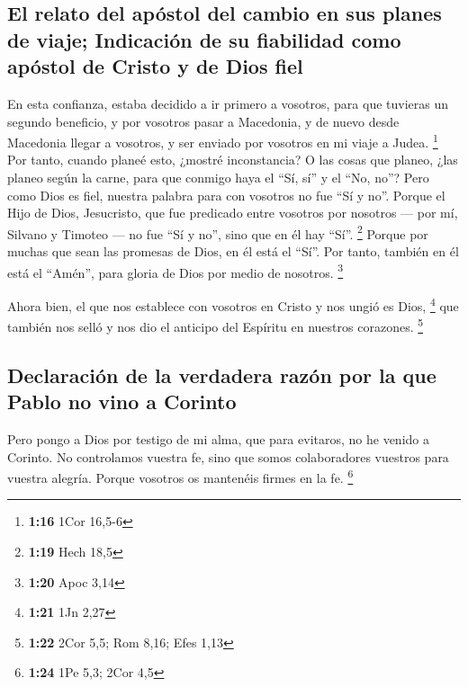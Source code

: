 \begin{paracol}{2}
{\subsection{El relato del apóstol del cambio en sus planes de viaje;
Indicación de su fiabilidad como apóstol de Cristo y de Dios
fiel}\label{el-relato-del-apuxf3stol-del-cambio-en-sus-planes-de-viaje-indicaciuxf3n-de-su-fiabilidad-como-apuxf3stol-de-cristo-y-de-dios-fiel}}

 En esta confianza, estaba decidido a ir primero a
vosotros, para que tuvieras un segundo beneficio,  y por
vosotros pasar a Macedonia, y de nuevo desde Macedonia llegar a
vosotros, y ser enviado por vosotros en mi viaje a Judea. \footnote{\textbf{1:16}
  1Cor 16,5-6}  Por tanto, cuando planeé esto, ¿mostré
inconstancia? O las cosas que planeo, ¿las planeo según la carne, para
que conmigo haya el ``Sí, sí'' y el ``No, no''?  Pero
como Dios es fiel, nuestra palabra para con vosotros no fue ``Sí y no''.
 Porque el Hijo de Dios, Jesucristo, que fue predicado
entre vosotros por nosotros --- por mí, Silvano y Timoteo --- no fue
``Sí y no'', sino que en él hay ``Sí''. \footnote{\textbf{1:19} Hech
  18,5}  Porque por muchas que sean las promesas de Dios,
en él está el ``Sí''. Por tanto, también en él está el ``Amén'', para
gloria de Dios por medio de nosotros. \footnote{\textbf{1:20} Apoc 3,14}

 Ahora bien, el que nos establece con vosotros en Cristo
y nos ungió es Dios, \footnote{\textbf{1:21} 1Jn 2,27} 
que también nos selló y nos dio el anticipo del Espíritu en nuestros
corazones. \footnote{\textbf{1:22} 2Cor 5,5; Rom 8,16; Efes 1,13}

\hypertarget{declaraciuxf3n-de-la-verdadera-razuxf3n-por-la-que-pablo-no-vino-a-corinto}{%
\subsection{Declaración de la verdadera razón por la que Pablo no vino a
Corinto}\label{declaraciuxf3n-de-la-verdadera-razuxf3n-por-la-que-pablo-no-vino-a-corinto}}

 Pero pongo a Dios por testigo de mi alma, que para
evitaros, no he venido a Corinto.  No controlamos vuestra
fe, sino que somos colaboradores vuestros para vuestra alegría. Porque
vosotros os mantenéis firmes en la fe. \footnote{\textbf{1:24} 1Pe 5,3;
  2Cor 4,5}


\end{paracol}
